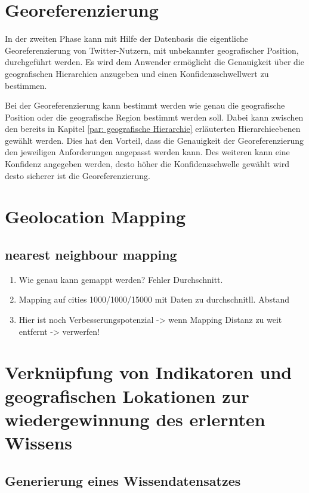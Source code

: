 	\section{Georeferenzierung}   
	In der zweiten Phase kann mit Hilfe der Datenbasis die eigentliche Georeferenzierung von Twitter-Nutzern, mit unbekannter geografischer Position, durchgeführt werden. 
	Es wird dem Anwender ermöglicht die Genauigkeit über die geografischen Hierarchien anzugeben und einen Konfidenzschwellwert zu bestimmen.

	Bei der Georeferenzierung kann bestimmt werden wie genau die geografische Position oder die geografische Region bestimmt werden soll. 
	Dabei kann zwischen den bereits in Kapitel \ref{par: geografische Hierarchie} erläuterten Hierarchieebenen gewählt werden.
	Dies hat den Vorteil, dass die Genauigkeit der Georeferenzierung den jeweiligen Anforderungen angepasst werden kann.
	Des weiteren kann eine Konfidenz angegeben werden, desto höher die Konfidenzschwelle gewählt wird desto sicherer ist die Georeferenzierung. 
	
	


\section{Geolocation Mapping}

	\subsection{nearest neighbour mapping}
		\begin{enumerate}
			\item {} Wie genau kann gemappt werden? Fehler Durchschnitt. 
			\item Mapping auf cities 1000/1000/15000 mit Daten zu durchschnitll. Abstand
			\item Hier ist noch Verbesserungspotenzial -> wenn Mapping Distanz zu weit entfernt -> verwerfen! 
		\end{enumerate} 

\section{Verknüpfung von Indikatoren und geografischen Lokationen zur wiedergewinnung des erlernten Wissens}
	
	\subsection{Generierung eines Wissendatensatzes}

